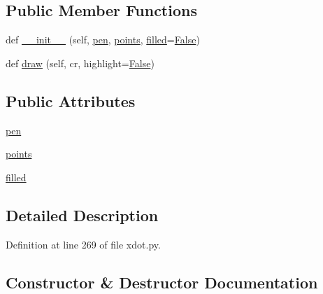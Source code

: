 \subsection*{Public Member Functions}
\begin{DoxyCompactItemize}
\item 
def \hyperlink{classsmacc__viewer_1_1xdot_1_1xdot_1_1BezierShape_a4ddc7c7b0758fa751369acb453850d10}{\+\_\+\+\_\+init\+\_\+\+\_\+} (self, \hyperlink{classsmacc__viewer_1_1xdot_1_1xdot_1_1BezierShape_acc54e94be731a399f2dc9fd91c0a1ead}{pen}, \hyperlink{classsmacc__viewer_1_1xdot_1_1xdot_1_1BezierShape_a73bc6ef056c4dff80f8ae562768ad32c}{points}, \hyperlink{classsmacc__viewer_1_1xdot_1_1xdot_1_1BezierShape_a5beff7e4ce0bb454545896ed8fee7d4d}{filled}=\hyperlink{namespacesmacc__viewer_a5928e8da279785cbab9011356c3eaa87}{False})
\item 
def \hyperlink{classsmacc__viewer_1_1xdot_1_1xdot_1_1BezierShape_ab0c6c3eaf382700767f150079855e0cc}{draw} (self, cr, highlight=\hyperlink{namespacesmacc__viewer_a5928e8da279785cbab9011356c3eaa87}{False})
\end{DoxyCompactItemize}
\subsection*{Public Attributes}
\begin{DoxyCompactItemize}
\item 
\hyperlink{classsmacc__viewer_1_1xdot_1_1xdot_1_1BezierShape_acc54e94be731a399f2dc9fd91c0a1ead}{pen}
\item 
\hyperlink{classsmacc__viewer_1_1xdot_1_1xdot_1_1BezierShape_a73bc6ef056c4dff80f8ae562768ad32c}{points}
\item 
\hyperlink{classsmacc__viewer_1_1xdot_1_1xdot_1_1BezierShape_a5beff7e4ce0bb454545896ed8fee7d4d}{filled}
\end{DoxyCompactItemize}


\subsection{Detailed Description}


Definition at line 269 of file xdot.\+py.



\subsection{Constructor \& Destructor Documentation}
